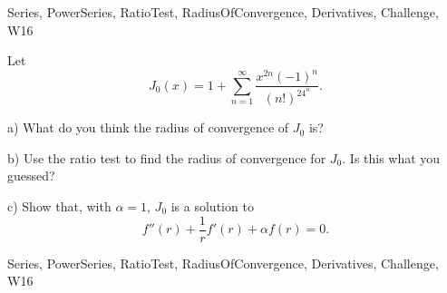 \begin{tagblock}{Series, PowerSeries, RatioTest, RadiusOfConvergence, Derivatives, Challenge, W16}
\begin{question}

Let 
\[
J_0(x)=1+\sum_{n=1}^{\infty}\frac {x^{2n}(-1)^n}{(n!)^24^n}.
\]

\bigskip

a) What do you think the radius of convergence of $J_0$ is? 

\bigskip

b) Use the ratio test to find the radius of convergence for $J_0$. Is this what you guessed?

\bigskip

c) Show that, with $\alpha=1$, $J_0$ is a solution to 
\[
f''(r)+\frac 1 rf'(r)+\alpha f(r)=0.
\]
	
	
\begin{tags}
	    Series, PowerSeries, RatioTest, RadiusOfConvergence, Derivatives, Challenge, W16
\end{tags}
	
\begin{diary}
	    
\end{diary}
	
\begin{solution}
	   
\end{solution}
	
\end{question}

\end{tagblock}

 

